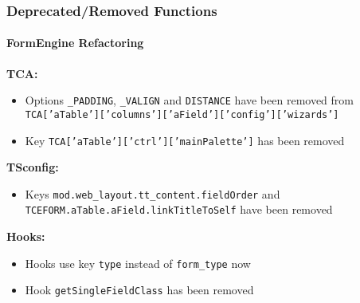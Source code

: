 %

\begin{frame}[fragile]
	\frametitle{Deprecated/Removed Functions}
	\framesubtitle{FormEngine Refactoring}

		\textbf{TCA:}

			\small
			\begin{itemize}

				\item Options \texttt{\_PADDING}, \texttt{\_VALIGN} and \texttt{DISTANCE}
					have been removed from
					\texttt{TCA['aTable']['columns']['aField']['config']['wizards']}

				\item Key \texttt{TCA['aTable']['ctrl']['mainPalette']} has been removed

			\end{itemize}

		\textbf{TSconfig:}

			\small
			\begin{itemize}
				\item Keys \texttt{mod.web\_layout.tt\_content.fieldOrder} and
					\texttt{TCEFORM.aTable.aField.linkTitleToSelf} have been removed
			\end{itemize}

		\textbf{Hooks:}

			\small
			\begin{itemize}
				\item Hooks use key \texttt{type} instead of \texttt{form\_type} now
				\item Hook \texttt{getSingleFieldClass} has been removed
			\end{itemize}

\end{frame}


